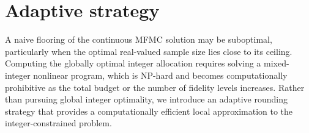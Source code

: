 \section{Adaptive strategy}
A naive flooring of the continuous MFMC solution may be suboptimal, particularly when the optimal real-valued sample size lies close to its ceiling. Computing the globally optimal integer allocation requires solving a mixed-integer nonlinear program, which is NP-hard and becomes computationally prohibitive as the total budget or the number of fidelity levels increases. Rather than pursuing global integer optimality, we introduce an adaptive rounding strategy that provides a computationally efficient local approximation to the integer-constrained problem.

